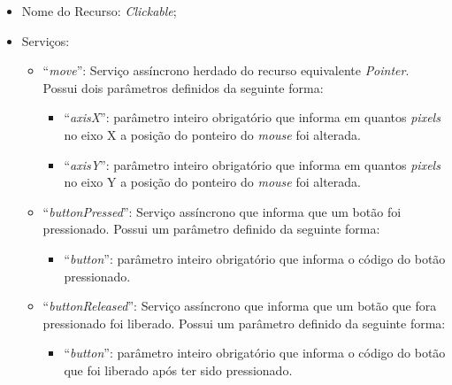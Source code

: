 \begin{itemize}
	
	\item Nome do Recurso: \emph{Clickable};

	\item Serviços:
		
		\begin{itemize}

			\item ``\emph{move}'': Serviço assíncrono herdado do recurso equivalente \emph{Pointer}. Possui dois parâmetros definidos da seguinte forma:

				\begin{itemize}
					\item ``\emph{axisX}'': parâmetro inteiro obrigatório que informa em quantos \emph{pixels} no eixo X a posição do ponteiro do \emph{mouse} foi alterada.

					\item ``\emph{axisY}'': parâmetro inteiro obrigatório que informa em quantos \emph{pixels} no eixo Y a posição do ponteiro do \emph{mouse} foi alterada.
				\end{itemize}
			
			\item ``\emph{buttonPressed}'': Serviço assíncrono que informa que um botão foi pressionado. Possui um parâmetro definido da seguinte forma:

				\begin{itemize}
					\item ``\emph{button}'': parâmetro inteiro obrigatório que informa o código do botão pressionado.
				\end{itemize}
			
			\item ``\emph{buttonReleased}'': Serviço assíncrono que informa que um botão que fora pressionado foi liberado. Possui um parâmetro definido da seguinte forma:

				\begin{itemize}
					\item ``\emph{button}'': parâmetro inteiro obrigatório que informa o código do botão que foi liberado após ter sido pressionado.
				\end{itemize}

		\end{itemize}
\end{itemize}

